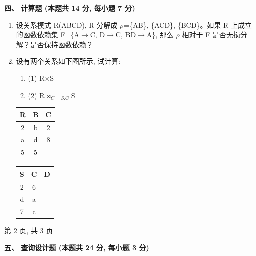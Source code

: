 \documentclass{ctexart} %
\begin{document}
\vspace{2em}

\raggedright
\textbf{\large 四、 计算题 (本题共 14 分, 每小题 7 分)}
\vspace{1em}

\begin{enumerate}[label=\arabic*.]
    \item 设关系模式 R(ABCD), R 分解成 $\rho$={\{AB\}, \{ACD\}, \{BCD\}}。如果 R 上成立的函数依赖集 F=\{A$\rightarrow$C, D$\rightarrow$C, BD$\rightarrow$A\}, 那么 $\rho$ 相对于 F 是否无损分解？是否保持函数依赖？
    \item 设有两个关系如下图所示, 试计算:
    \begin{enumerate}[label=(\arabic*)]
        \item (1) R$\times$S
        \item (2) R$\bowtie_{C=S.C}$S
    \end{enumerate}
    \vspace{1em} %
    \centering
    \begin{tabular}{|c|c|c|}
    \hline
    R & B & C \\
    \hline
    2 & b & 2 \\
    a & d & 8 \\
    5 & 5 & \\ %
    \hline
    \end{tabular}
    \hspace{2em} %
    \begin{tabular}{|c|c|c|}
    \hline
    S & C & D \\
    \hline
    2 & 6 & \\ %
    d & a &  \\ %
    7 & c &  \\ %
    \hline
    \end{tabular}
\end{enumerate}

\vfill
\centering
第 2 页, 共 3 页

\clearpage %

\pagestyle{plain}

\raggedright
\textbf{\large 五、 查询设计题 (本题共 24 分, 每小题 3 分)} %
\vspace{1em}
\end{document}
